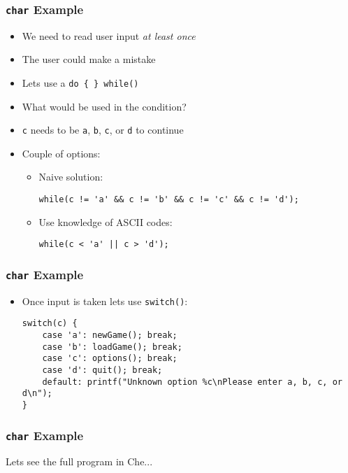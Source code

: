 \documentclass[14pt]{beamer}
\begin{document}
\begin{frame}[fragile]
\frametitle{\texttt{char} Example}
\begin{itemize}
\item We need to read user input \textit{at least once}
\item The user could make a mistake
\item Lets use a \texttt{do \{ \} while()}
\pause
\item What would be used in the condition?
\pause
\item \texttt{c} needs to be \texttt{a}, \texttt{b}, \texttt{c}, or \texttt{d} to continue
\pause
\item Couple of options:
	\begin{itemize}
		\item Naive solution:
\begin{lstlisting}[style=CStyle]
while(c != 'a' && c != 'b' && c != 'c' && c != 'd');
\end{lstlisting}
		\item Use knowledge of ASCII codes:
\begin{lstlisting}[style=CStyle]
while(c < 'a' || c > 'd');
\end{lstlisting}
	\end{itemize}
\end{itemize}
\end{frame}

\begin{frame}[fragile]
\frametitle{\texttt{char} Example}
\begin{itemize}
\item Once input is taken lets use \texttt{switch()}:
\begin{lstlisting}[style=CStyle]
switch(c) {
	case 'a': newGame(); break;
	case 'b': loadGame(); break;
	case 'c': options(); break;
	case 'd': quit(); break;
	default: printf("Unknown option %c\nPlease enter a, b, c, or d\n");
}
\end{lstlisting}
\end{itemize}
\end{frame}

\begin{frame}
\frametitle{\texttt{char} Example}
\begin{center}
Lets see the full program in Che...
\end{center}
\end{frame}
\end{document}
